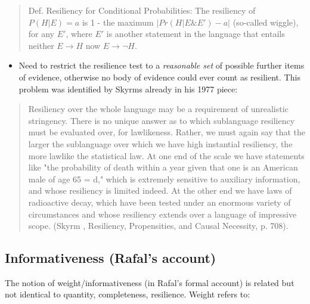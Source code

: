 \documentclass[
  10pt,
  dvipsnames,enabledeprecatedfontcommands]{scrartcl}
\providecommand{\tightlist}{%
  \setlength{\itemsep}{0pt}\setlength{\parskip}{0pt}}
\begin{document}
\begin{quote}
Def. Resiliency for Conditional Probabilities: The resiliency of $P(H \vert E) = a$ 
is 1 - the maximum $\vert Pr(H \vert E \& E') - a \vert$ (so-called wiggle), for any $E'$, where $E'$ is another statement in the language that entails neither $E \rightarrow H$ now $E \rightarrow \neg H$.
\end{quote}

\begin{itemize}
\tightlist
\item
  Need to restrict the resilience test to a \emph{reasonable set} of
  possible further items of evidence, otherwise no body of evidence
  could ever count as resilient. This problem was identified by Skyrms
  already in his 1977 piece:
\end{itemize}

\begin{quote}
Resiliency over the whole language may be a requirement of unrealistic stringency. There is no unique answer as to which sublanguage resiliency must be evaluated over, for lawlikeness. Rather, we must again say that the larger the sublanguage over which we have high instantial resiliency, the more lawlike the statistical law. At one end of the scale we have statements like "the probability of death within a year given that one is an American male of age 65 = d," which is extremely sensitive to auxiliary information, and whose resiliency is limited indeed. At the other end we have laws of radioactive decay, which have been tested under an enormous variety of circumstances and whose resiliency extends over a language of impressive scope. (Skyrm , Resiliency, Propensities, and Causal Necessity, p. 708).
\end{quote}


\hypertarget{informativeness-rafals-account}{%
\subsection{Informativeness (Rafal's
account)}\label{informativeness-rafals-account}}

The notion of weight/informativeness (in Rafal's formal account) is
related but not identical to quantity, completeness, resilience. Weight
refers to:
\end{document}
